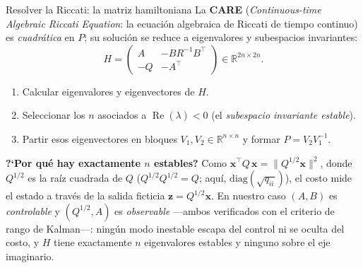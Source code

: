 \documentclass[aspectratio=169,11pt]{beamer}
\DeclareMathOperator{\Real}{Re}
\newcommand{\R}{\mathbb{R}}
\newcommand{\xv}{\bm{x}}
\begin{document}
\begin{frame}{Resolver la Riccati: la matriz hamiltoniana}
  La \textbf{CARE} (\emph{Continuous-time Algebraic Riccati Equation}: la
  ecuaci\'on algebraica de Riccati de tiempo continuo) es \emph{cuadr\'atica}
  en $P$; su soluci\'on se reduce a eigenvalores y subespacios invariantes:
  \[
    H=\begin{pmatrix}A & -BR^{-1}B^\top\\ -Q & -A^\top\end{pmatrix}\in\R^{2n\times2n}.
  \]
  \vspace{-0.5em}
  \begin{enumerate}
    \small
    \item[$i$.] Calcular eigenvalores y eigenvectores de $H$.
    \item[$ii$.] Seleccionar los $n$ asociados a $\Real(\lambda)<0$
          (el \emph{subespacio invariante estable}).
    \item[$iii$.] Partir esos eigenvectores en bloques $V_1,V_2\in\R^{n\times n}$
          y formar $P=V_2V_1^{-1}$.
  \end{enumerate}
  \begin{cajaclave}
    \footnotesize \textbf{?`Por qu\'e hay exactamente $n$ estables?} Como
    $\xv^\top Q\,\xv=\lVert Q^{1/2}\xv\rVert^2$, donde $Q^{1/2}$ es la ra\'iz
    cuadrada de $Q$ ($Q^{1/2}Q^{1/2}=Q$; aqu\'i,
    $\mathrm{diag}(\sqrt{q_{ii}})$), el costo mide el estado a trav\'es de la salida
    ficticia $\bm z=Q^{1/2}\xv$. En nuestro caso $(A,B)$ es \emph{controlable} y
    $(Q^{1/2},A)$ es \emph{observable} ---ambos verificados con el criterio de
    rango de Kalman---: ning\'un modo inestable escapa del control ni se oculta
    del costo, y $H$ tiene exactamente $n$ eigenvalores estables y ninguno sobre
    el eje imaginario.
  \end{cajaclave}
\end{frame}
\end{document}
